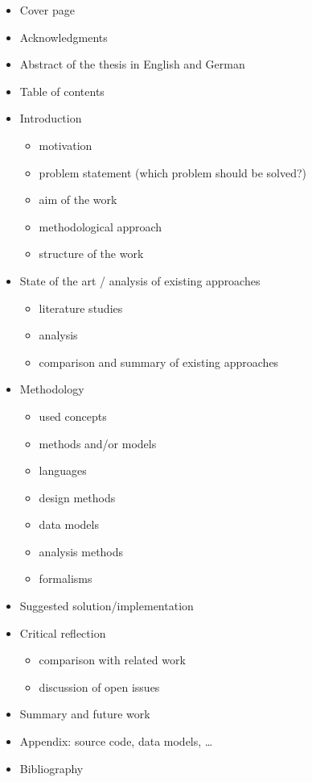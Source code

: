 \begin{itemize}
  \item	Cover page
  \item Acknowledgments
  \item Abstract of the thesis in English and German
  \item Table of contents
  \item Introduction
  	\begin{itemize}
  		\item motivation
  		\item problem statement (which problem should be solved?)
  		\item aim of the work
  		\item methodological approach
  		\item structure of the work
  	\end{itemize}
  \item State of the art / analysis of existing approaches
  	\begin{itemize}
  		\item literature studies
  		\item analysis
  		\item comparison and summary of existing approaches
  	\end{itemize}
  \item Methodology
  	\begin{itemize}
  		\item used concepts
  		\item methods and/or models
  		\item languages
  		\item design methods
  		\item data models
  		\item analysis methods
  		\item formalisms
  	\end{itemize}
  \item Suggested solution/implementation
  \item Critical reflection
  	\begin{itemize}
  		\item comparison with related work
  		\item discussion of open issues
  	\end{itemize}
  \item Summary and future work
  \item Appendix: source code, data models, \dots
  \item Bibliography
\end{itemize}

